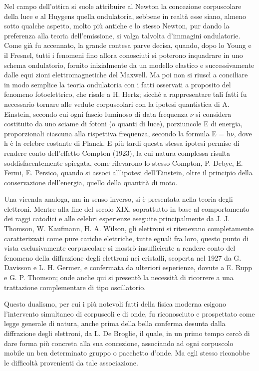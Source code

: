 \documentclass[a4paper]{article}
\begin{document}
Nel campo dell'ottica si suole attribuire al Newton la concezione corpuscolare della luce e al Huygens quella ondulatoria, sebbene in realtà esse siano, almeno sotto qualche aspetto, molto più antiche e lo stesso Newton, pur dando la preferenza alla teoria dell'emissione, si valga talvolta d'immagini ondulatorie. Come già fu accennato, la grande contesa parve decisa, quando, dopo lo Young e il Fresnel, tutti i fenomeni fino allora conosciuti si poterono inquadrare in uno schema ondulatorio, fornito inizialmente da un modello elastico e successivamente dalle equi zioni elettromagnetiche del Maxwell. Ma poi non si riuscì a conciliare in modo semplice la teoria ondulatoria con i fatti osservati a proposito del fenomeno fotoelettrico, che risale a H. Hertz; sicché a rappresentare tali fatti fu necessario tornare alle vedute corpuscolari con la ipotesi quantistica di A. Einstein, secondo cui ogni fascio luminoso di data frequenza $\nu$ si considera costituito da uno sciame di fotoni (o quanti di luce), porziuncole E di energia, proporzionali ciascuna alla rispettiva frequenza, secondo la formula E = h$\nu$, dove h è la celebre costante di Planck. E più tardi questa stessa ipotesi permise di rendere conto dell'effetto Compton (1923), la cui natura complessa risulta soddisfacentemente spiegata, come rilevarono lo stesso Compton, P. Debye, E. Fermi, E. Persico, quando si associ all'ipotesi dell'Einstein, oltre il principio della conservazione dell'energia, quello della quantità di moto.

Una vicenda analoga, ma in senso inverso, si è presentata nella teoria degli elettroni. Mentre alla fine del secolo XIX, soprattutto in base al comportamento dei raggi catodici e alle celebri esperienze eseguite principalmente da J. J. Thomson, W. Kaufmann, H. A. Wilson, gli elettroni si ritenevano completamente caratterizzati come pure cariche elettriche, tutte eguali fra loro, questo punto di vista esclusivamente corpuscolare si mostrò insufficiente a rendere conto del fenomeno della diffrazione degli elettroni nei cristalli, scoperta nel 1927 da G. Davisson e L. H. Germer, e confermata da ulteriori esperienze, dovute a E. Rupp e G. P. Thomson; onde anche qui si presentò la necessità di ricorrere a una trattazione complementare di tipo oscillatorio.

Questo dualismo, per cui i più notevoli fatti della fisica moderna esigono l'intervento simultaneo di corpuscoli e di onde, fu riconosciuto e prospettato come legge generale di natura, anche prima della bella conferma desunta dalla diffrazione degli elettroni, da L. De Broglie, il quale, in un primo tempo cercò di dare forma più concreta alla sua concezione, associando ad ogni corpuscolo mobile un ben determinato gruppo o pacchetto d'onde. Ma egli stesso riconobbe le difficoltà provenienti da tale associazione.
\end{document}
